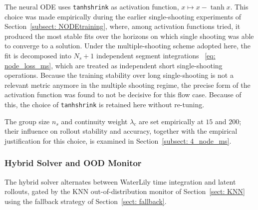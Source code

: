 The neural ODE uses \texttt{tanhshrink} as activation function, $x \mapsto x - \tanh x$. This choice was made empirically during the earlier single-shooting experiments of Section~\ref{subsect: NODEtraining}, where, among activation functions tried, it produced the most stable fits over the horizons on which single shooting was able to converge to a solution. Under the multiple-shooting scheme adopted here, the fit is decomposed into $N_s+1$ independent segment integrations ~\eqref{eq: node_loss_ms}, which are treated as independent short single-shooting operations. Because the training stability over long single-shooting is not a relevant metric anymore in the multiple shooting regime, the precise form of the activation function was found to not be decisive for this flow case. Because of this, the choice of \texttt{tanhshrink} is retained here without re-tuning. 


The group size $n_s$ and continuity weight $\lambda_c$ are set empirically at $15$ and $200$; their influence on rollout
stability and accuracy, together with the empirical justification for this choice, is examined in Section~\ref{subsect: 4_node_ms}.

\subsubsection{Hybrid Solver and OOD Monitor}
\label{subsubsect: 4_baseline_hybrid}

The hybrid solver alternates between WaterLily time integration and latent rollouts, gated by the KNN out-of-distribution monitor of Section~\ref{sect: KNN} using the fallback strategy of Section~\ref{sect: fallback}. 

